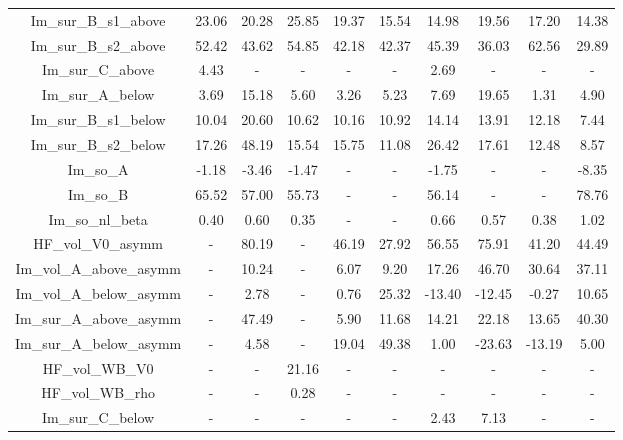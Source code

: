 \begin{tabular}{|c||c||c||c||c||c||c||c||c||c|}
    Im\_sur\_B\_s1\_above & 23.06 & 20.28 & 25.85 & 19.37 & 15.54 & 14.98 & 19.56 & 17.20 & 14.38\\
    Im\_sur\_B\_s2\_above & 52.42 & 43.62 & 54.85 & 42.18 & 42.37 & 45.39 & 36.03 & 62.56 & 29.89\\
    Im\_sur\_C\_above & 4.43 & - & - & - & - & 2.69 & - & - & -\\
    Im\_sur\_A\_below & 3.69 & 15.18 & 5.60 & 3.26 & 5.23 & 7.69 & 19.65 & 1.31 & 4.90\\
    Im\_sur\_B\_s1\_below & 10.04 & 20.60 & 10.62 & 10.16 & 10.92 & 14.14 & 13.91 & 12.18 & 7.44\\
    Im\_sur\_B\_s2\_below & 17.26 & 48.19 & 15.54 & 15.75 & 11.08 & 26.42 & 17.61 & 12.48 & 8.57\\
    Im\_so\_A & -1.18 & -3.46 & -1.47 & - & - & -1.75 & - & - & -8.35\\
    Im\_so\_B & 65.52 & 57.00 & 55.73 & - & - & 56.14 & - & - & 78.76\\
    Im\_so\_nl\_beta & 0.40 & 0.60 & 0.35 & - & - & 0.66 & 0.57 & 0.38 & 1.02\\
    HF\_vol\_V0\_asymm & - & 80.19 & - & 46.19 & 27.92 & 56.55 & 75.91 & 41.20 & 44.49\\
    Im\_vol\_A\_above\_asymm & - & 10.24 & - & 6.07 & 9.20 & 17.26 & 46.70 & 30.64 & 37.11\\
    Im\_vol\_A\_below\_asymm & - & 2.78 & - & 0.76 & 25.32 & -13.40 & -12.45 & -0.27 & 10.65\\
    Im\_sur\_A\_above\_asymm & - & 47.49 & - & 5.90 & 11.68 & 14.21 & 22.18 & 13.65 & 40.30\\
    Im\_sur\_A\_below\_asymm & - & 4.58 & - & 19.04 & 49.38 & 1.00 & -23.63 & -13.19 & 5.00\\
    HF\_vol\_WB\_V0 & - & - & 21.16 & - & - & - & - & - & -\\
    HF\_vol\_WB\_rho & - & - & 0.28 & - & - & - & - & - & -\\
    Im\_sur\_C\_below & - & - & - & - & - & 2.43 & 7.13 & - & -\\
    \hline
\end{tabular}
